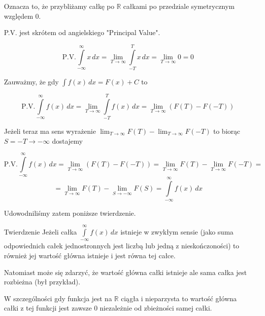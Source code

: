 Oznacza to, że przybliżamy całkę po $\mathbb{R}$ całkami po przedziale symetrycznym względem 0.

P.V. jest skrótem od angielskiego "Principal Value". \\

\begin{przyklad}

$$ \textrm{P.V.} \int\limits_{-\infty}^{\infty} x \,dx = \lim_{T \to \infty} \int\limits_{-T}^{T} x\,dx
= \lim_{T \to \infty} 0 = 0 $$

Zauważmy, że gdy $ \int f(x) \,dx = F(x) + C $ to

$$ \textrm{P.V.} \int\limits_{-\infty}^{\infty} f(x) \,dx = \lim_{T \to \infty} \int\limits_{-T}^{T} f(x) \,dx
= \lim_{T \to \infty} (F(T) - F(-T)) $$

Jeżeli teraz ma sens wyrażenie $ \lim_{T \to \infty} F(T ) - \lim_{T \to \infty} F(-T) $ to biorąc $ S = -T \to -\infty $ dostajemy

$$ \textrm{P.V.} \int\limits_{-\infty}^{\infty} f(x) \,dx = \lim_{T \to \infty} (F(T) - F(-T)) = 
\lim_{T \to \infty} F(T) - \lim_{T \to \infty} F(-T) = $$ $$ =  \lim_{T \to \infty} F(T) - \lim_{S \to -\infty} F(S)
= \int\limits_{-\infty}^{\infty} f(x) \,dx $$
\end{przyklad}

Udowodniliśmy zatem poniższe twierdzenie. 

\begin{tw}{Twierdzenie}
Jeżeli całka $ \int\limits_{-\infty}^{\infty} f(x) \,dx $ istnieje w zwykłym sensie (jako suma odpowiednich całek jednostronnych
jest liczbą lub jedną z nieskończoności) to również jej wartość główna istnieje i jest równa tej całce.
\end{tw}

Natomiast może się zdarzyć, że wartość główna całki istnieje ale sama całka jest rozbieżna (był przykład).

W szczególności gdy funkcja jest na $\mathbb{R}$ ciągła i nieparzysta to wartość główna całki z tej funkcji jest zawsze
0 niezależnie od zbieżności samej całki.